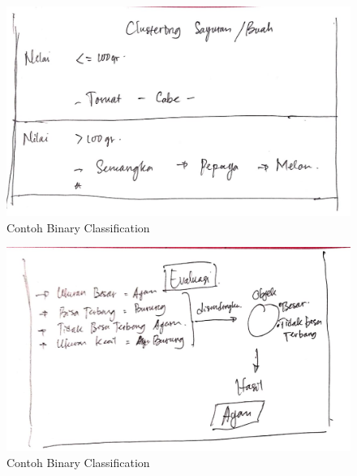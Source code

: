 \begin{figure}[ht]
      \centerline{\includegraphics[width=1\textwidth]
      {figures/c13}}
      \caption{Contoh Binary Classification}
      \label{c13}
      \end{figure}

\begin{figure}[ht]
      \centerline{\includegraphics[width=1\textwidth]
      {figures/c14}}
      \caption{Contoh Binary Classification}
      \label{c14}
      \end{figure}

